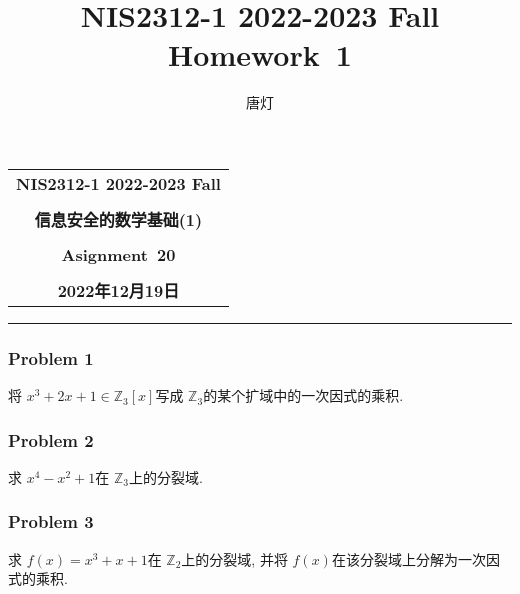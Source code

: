 \documentclass[a4paper,12pt]{ctexart}
\title{NIS2312-1 2022-2023 Fall Homework~1}
\author{唐灯}
\newcommand{\Z}{\mathbb{Z}}
\begin{document}
  \begin{center}

  \vspace{-0.3in}
  \begin{tabular}{c}
    \textbf{\Large NIS2312-1 2022-2023 Fall} \\
    \textbf{\Large  } \\
    \textbf{\Large  信息安全的数学基础(1)} \\
    \textbf{\Large  } \\
    \textbf{\Large  Asignment~20} \\
    \textbf{\Large  } \\
    \textbf{\Large 2022年12月19日} \\
  \end{tabular}
  \end{center}
  \noindent
  \rule{\linewidth}{0.4pt}
  

\subsubsection*{Problem 1}
    将 $ x^3+2x+1\in\Z_3[x] $写成 $ \Z_3 $的某个扩域中的一次因式的乘积.

\subsubsection*{Problem 2}
    求 $ x^4-x^2+1 $在 $ \Z_3 $上的分裂域.

\subsubsection*{Problem 3}
    求 $ f(x)=x^3+x+1 $在 $ \Z_2 $上的分裂域, 并将 $ f(x) $在该分裂域上分解为一次因式的乘积. 
    
\end{document}
